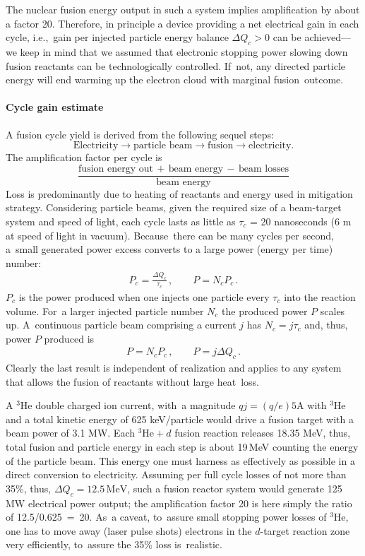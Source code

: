 \documentclass[particles,article,accept,pdftex,moreauthors]{Definitions/mdpi}
\begin{document}
The nuclear fusion energy output in such a system implies amplification by about a factor 20. Therefore, in principle a device providing a net electrical gain in each cycle, i.e.,~gain per injected particle energy balance $\Delta Q_c>0$ can be achieved---we keep in mind that we assumed that electronic stopping power slowing down fusion reactants can be technologically controlled. If~not, any directed particle energy will end warming up the electron cloud with marginal fusion~outcome.

\vspace{-6pt}\paragraph*{\bf Cycle gain estimate}
A fusion cycle yield is derived from the following sequel steps:
\[
\text{Electricity}\to\text{particle beam}\to\text{fusion}\to\text{electricity.}
\]
The amplification factor per cycle is
\[
\frac{\text{fusion energy out}\,+\,\text{beam energy}\,-\,\text{beam losses}}{\text{beam energy}}
\]
Loss is predominantly due to heating of reactants and energy used in mitigation strategy. Considering particle beams, given the required size of a beam-target system and speed of light, each cycle lasts as little as $\tau_c$ = 20 nanoseconds (6 m at speed of light in vacuum). Because~there can be many cycles per second, a~small generated power excess converts to a large power (energy per time) number:
\begin{align}
 P_c=\frac{\Delta Q_c}{\tau_c}\,, \qquad P= N_cP_c\,.
\end{align}
$P_c$ is the power produced when one injects one particle every $\tau_c$ into the reaction volume. For~a larger injected particle number $N_c$ the produced power $P$ scales up. A~continuous particle beam comprising a current $j$ has $N_c=j\tau_c$ and, thus, power $P$ produced is
\begin{align}
 P= N_cP_c\,, \qquad P=j\Delta Q_c\,.
\end{align}
Clearly the last result is independent of realization and applies to any system that allows the fusion of reactants without large heat~loss.

A ${}^3\mathrm{He}$ double charged ion current, with~a magnitude $qj= (q/e) 5 \mathrm{A}$ with ${}^3\mathrm{He}$ and a total kinetic energy of 625 keV/particle would drive a fusion target with a beam power of 3.1 MW. Each ${}^3\mathrm{He}+d$ fusion reaction releases 18.35 MeV, thus, total fusion and particle energy in each step is about 19\,MeV counting the energy of the particle beam. This energy one must harness as effectively as possible in a direct conversion to electricity. Assuming per full cycle losses of not more than 35\%, thus, $\Delta Q_c=12.5\,\mathrm{MeV}$, such a fusion reactor system would generate 125\,MW electrical power output; the amplification factor 20 is here simply the ratio of 12.5/0.625~=~20. As~a caveat, to~assure small stopping power losses of ${}^3\mathrm{He}$, one has to move away (laser pulse shots) electrons in the $d$-target reaction zone very efficiently, to~assure the 35\% loss is~realistic.
\end{document}
